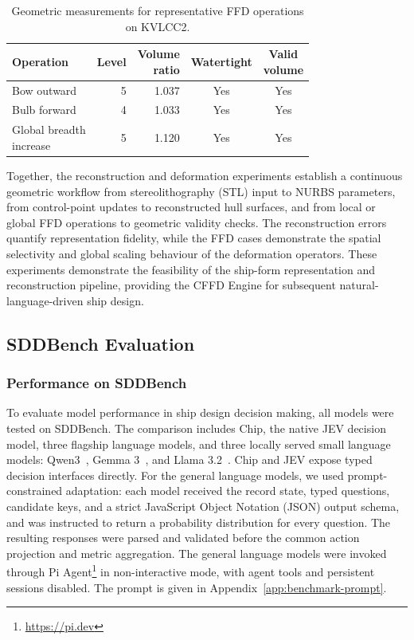 \documentclass[a4paper,fleqn]{cas-dc}
\begin{document}
\begin{table}[t]
\caption{Geometric measurements for representative FFD operations on KVLCC2.}
\label{tab:ffd-validity}
\centering
\begin{tabular*}{\tblwidth}{@{\extracolsep{\fill}}lrrcc@{}}
\toprule
Operation & Level & \shortstack{Volume\\ratio} & Watertight & \shortstack{Valid\\volume} \\
\midrule
Bow outward             & 5 & 1.037 & Yes & Yes \\
Bulb forward            & 4 & 1.033 & Yes & Yes \\
\shortstack[l]{Global breadth\\increase} & 5 & 1.120 & Yes & Yes \\
\bottomrule
\end{tabular*}
\end{table}

Together, the reconstruction and deformation experiments establish a continuous
geometric workflow from stereolithography (STL) input to NURBS parameters, from control-point updates
to reconstructed hull surfaces, and from local or global FFD operations to
geometric validity checks. The reconstruction errors quantify representation
fidelity, while the FFD cases demonstrate the spatial selectivity and global
scaling behaviour of the deformation operators. These experiments demonstrate
the feasibility of the ship-form representation and reconstruction pipeline,
providing the CFFD Engine for subsequent natural-language-driven ship
design.

\subsection{SDDBench Evaluation}
\label{sec:benchmark}

\subsubsection{Performance on SDDBench}
\label{sec:ship-decision-results}

To evaluate model performance in ship design decision making, all models were
tested on SDDBench. The comparison includes Chip, the native JEV decision model,
three flagship language models, and three locally served small language models:
Qwen3~\citep{yang2025qwen3}, Gemma 3~\citep{gemmateam2025gemma3}, and Llama 3.2~\citep{grattafiori2024llama3}.
Chip and JEV expose typed decision interfaces directly. For the general language
models, we used prompt-constrained adaptation: each model received the record
state, typed questions, candidate keys, and a strict JavaScript Object Notation
(JSON) output schema, and was
instructed to return a probability distribution for every question. The resulting
responses were parsed and validated before the common action projection and
metric aggregation. The general language models were invoked through Pi
Agent\footnote{\url{https://pi.dev}} in non-interactive mode, with agent tools
and persistent sessions disabled. The prompt is given in
Appendix~\ref{app:benchmark-prompt}.
\end{document}
